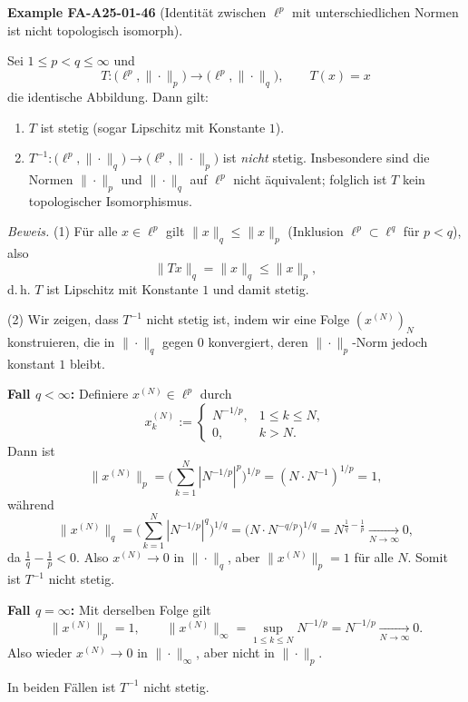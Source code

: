 \documentclass[10pt, letterpaper]{article}
\newcommand{\CustomHeading}[3]{%
  \par\medskip\noindent%
  \textbf{#1 #2} \textnormal{(#3)}.\enskip%
}
\newenvironment{EXA}[2]{\begin{unitbox}\CustomHeading{Example}{#1}{#2}}{\end{unitbox}}
\begin{document}
\begin{EXA}{FA-A25-01-46}{Identität zwischen $\ell^p$ mit unterschiedlichen Normen ist nicht topologisch isomorph}
Sei $1\le p<q\le\infty$ und
\[
T:\big(\ell^{p},\|\cdot\|_{p}\big)\longrightarrow \big(\ell^{p},\|\cdot\|_{q}\big),\qquad T(x)=x
\]
die identische Abbildung. Dann gilt:
\begin{enumerate}
\item $T$ ist stetig (sogar Lipschitz mit Konstante $1$).
\item $T^{-1}:\big(\ell^{p},\|\cdot\|_{q}\big)\to\big(\ell^{p},\|\cdot\|_{p}\big)$ ist \emph{nicht} stetig. Insbesondere sind die Normen $\|\cdot\|_{p}$ und $\|\cdot\|_{q}$ auf $\ell^{p}$ nicht äquivalent; folglich ist $T$ kein topologischer Isomorphismus.
\end{enumerate}

\emph{Beweis.}
(1) Für alle $x\in\ell^p$ gilt $\|x\|_{q}\le \|x\|_{p}$ (Inklusion $\ell^p\subset \ell^q$ für $p<q$), also
\[
\|Tx\|_{q}=\|x\|_{q}\le \|x\|_{p},
\]
d.\,h. $T$ ist Lipschitz mit Konstante $1$ und damit stetig.

\smallskip
(2) Wir zeigen, dass $T^{-1}$ nicht stetig ist, indem wir eine Folge $(x^{(N)})_{N}$ konstruieren, die in $\|\cdot\|_{q}$ gegen $0$ konvergiert, deren $\|\cdot\|_{p}$-Norm jedoch konstant $1$ bleibt.

\textbf{Fall $q<\infty$:} Definiere $x^{(N)}\in\ell^p$ durch
\[
x^{(N)}_k:=\begin{cases}
N^{-1/p}, & 1\le k\le N,\\
0,& k>N.
\end{cases}
\]
Dann ist
\[
\|x^{(N)}\|_{p}=\Big(\sum_{k=1}^{N} |N^{-1/p}|^{p}\Big)^{1/p}
=(N\cdot N^{-1})^{1/p}=1,
\]
während
\[
\|x^{(N)}\|_{q}=\Big(\sum_{k=1}^{N} |N^{-1/p}|^{q}\Big)^{1/q}
= \big(N\cdot N^{-q/p}\big)^{1/q} = N^{\frac{1}{q}-\frac{1}{p}}\xrightarrow[N\to\infty]{}0,
\]
da $\frac{1}{q}-\frac{1}{p}<0$. Also $x^{(N)}\to 0$ in $\|\cdot\|_{q}$, aber $\|x^{(N)}\|_{p}=1$ für alle $N$. Somit ist $T^{-1}$ nicht stetig.

\textbf{Fall $q=\infty$:} Mit derselben Folge gilt
\[
\|x^{(N)}\|_{p}=1,\qquad \|x^{(N)}\|_{\infty}=\sup_{1\le k\le N} N^{-1/p}=N^{-1/p}\xrightarrow[N\to\infty]{}0.
\]
Also wieder $x^{(N)}\to 0$ in $\|\cdot\|_{\infty}$, aber nicht in $\|\cdot\|_{p}$.

In beiden Fällen ist $T^{-1}$ nicht stetig.
\end{EXA}
\end{document}
